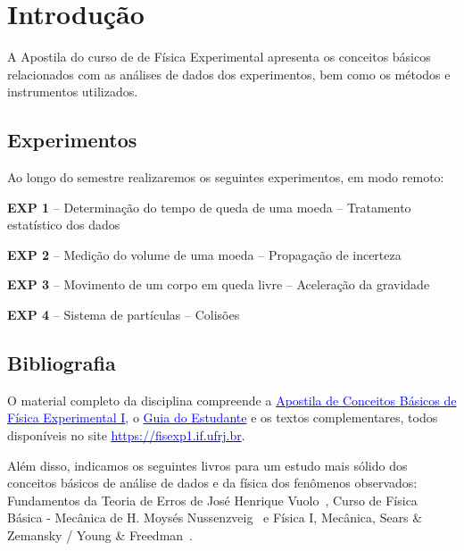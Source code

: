 \chapter{Introdução}\vspace{-1.5cm}
A Apostila do curso de de Física Experimental apresenta 
os conceitos b\'asicos relacionados com as análises de dados dos experimentos, bem como os métodos e instrumentos utilizados.
\vspace{-0.5cm}
\section*{Experimentos}

Ao longo do semestre realizaremos os seguintes experimentos, em  modo remoto:

\begin{descrip}
\item[\bf EXP 1] -- Determinação do tempo de queda de uma moeda -- Tratamento estatístico dos dados
\item[\bf EXP 2] -- Medição do volume de uma moeda -- Propagação de incerteza
\item[\bf EXP 3] -- Movimento de um corpo em queda livre -- Aceleração da gravidade 
\item[\bf EXP 4] -- Sistema de partículas -- Colisões 
\end{descrip}



\vspace{-0.5cm}
\section*{Bibliografia}

O material completo da disciplina compreende a \href{https://fisexp1.if.ufrj.br/wp-content/uploads/2020/08/Apostila-1.pdf}{\textcolor {blue}
{Apostila de Conceitos Básicos de Física Experimental I}}, o  
\href{https://fisexp1.if.ufrj.br/wp-content/uploads/2020/08/GuiadoEstudante-2.pdf} {\textcolor {blue}
{Guia do Estudante}}
 e os textos complementares, todos disponí­veis no site \href{https://fisexp1.if.ufrj.br/}{\textcolor {blue}
{https://fisexp1.if.ufrj.br}}.


 
 Além disso, indicamos os seguintes livros para um estudo mais sólido dos conceitos básicos de análise de dados e da física dos fenômenos observados: Fundamentos da Teoria de Erros de José Henrique Vuolo~\cite{Vuolo},
 Curso de Fí­sica Básica - Mecânica de H. Moysés Nussenzveig~\cite{Moyses}
 e Fí­sica I, Mecânica, Sears \& Zemansky / Young \& Freedman~\cite{SearsZemansky}.